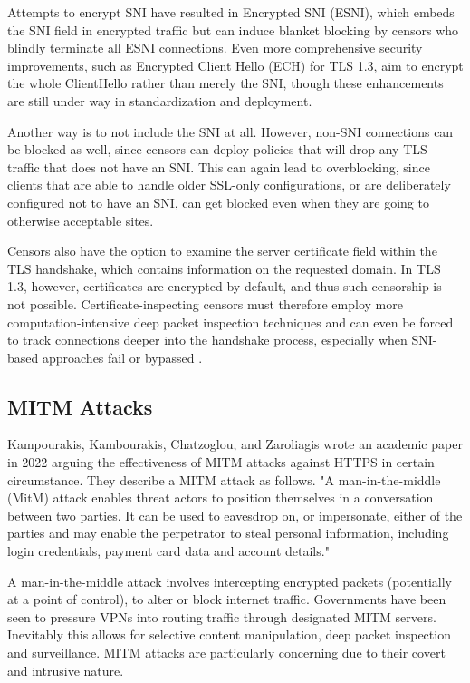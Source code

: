 Attempts to encrypt SNI have resulted in Encrypted SNI (ESNI), which embeds the SNI field in encrypted traffic but can induce blanket blocking by censors who blindly terminate all ESNI connections. Even more comprehensive security improvements, such as Encrypted Client Hello (ECH) for TLS 1.3, aim to encrypt the whole ClientHello rather than merely the SNI, though these enhancements are still under way in standardization and deployment.

Another way is to not include the SNI at all. However, non-SNI connections can be blocked as well, since censors can deploy policies that will drop any TLS traffic that does not have an SNI. This can again lead to overblocking, since clients that are able to handle older SSL-only configurations, or are deliberately configured not to have an SNI, can get blocked even when they are going to otherwise acceptable sites.

Censors also have the option to examine the server certificate field within the TLS handshake, which contains information on the requested domain. In TLS 1.3, however, certificates are encrypted by default, and thus such censorship is not possible. Certificate-inspecting censors must therefore employ more computation-intensive deep packet inspection techniques and can even be forced to track connections deeper into the handshake process, especially when SNI-based approaches fail or bypassed \cite{rfc9505}.

\subsection{MITM Attacks}
Kampourakis, Kambourakis, Chatzoglou, and Zaroliagis wrote an academic paper in 2022 arguing the effectiveness of MITM attacks against HTTPS in certain circumstance. They describe a MITM attack as follows. 
"A man-in-the-middle (MitM) attack enables threat actors to position themselves in a conversation between two parties. It can be used to eavesdrop on, or impersonate, either of the parties and may enable the perpetrator to steal personal information, including login credentials, payment card data and account details."\cite{MITMvHTTPS}

A man-in-the-middle attack involves intercepting encrypted packets (potentially at a point of control), to alter or block internet traffic. Governments have been seen to pressure VPNs into routing traffic through designated MITM servers. Inevitably this allows for selective content manipulation, deep packet inspection and surveillance. MITM attacks are particularly concerning due to their covert and intrusive nature. 

